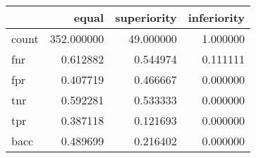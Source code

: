 \begin{tabular}{lrrr}
\toprule
{} &       equal &  superiority &  inferiority \\
\midrule
count &  352.000000 &    49.000000 &     1.000000 \\
fnr   &    0.612882 &     0.544974 &     0.111111 \\
fpr   &    0.407719 &     0.466667 &     0.000000 \\
tnr   &    0.592281 &     0.533333 &     0.000000 \\
tpr   &    0.387118 &     0.121693 &     0.000000 \\
bacc  &    0.489699 &     0.216402 &     0.000000 \\
\bottomrule
\end{tabular}
